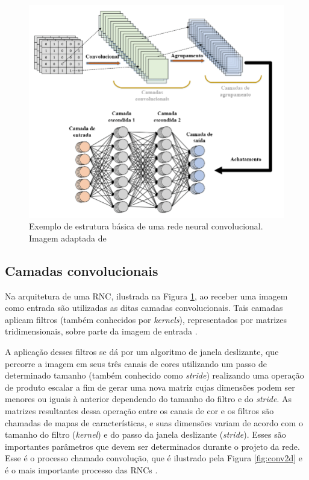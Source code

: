 \begin{figure}[H]
  \centering
  \includegraphics[width=.8\linewidth]{figures/2_theoric_foundamentations/cnn.png}
  \caption[Estrutura básica de uma rede neural convolucional.]{Exemplo de estrutura básica de uma rede neural convolucional. Imagem adaptada de \cite{srinivasan2021durld}}
  \label{fig:cnn}
\end{figure}

\subsection{Camadas convolucionais}

Na arquitetura de uma \ac{RNC}, ilustrada na Figura \ref{fig:cnn}, ao receber uma imagem como entrada são utilizadas as ditas camadas convolucionais. Tais camadas aplicam filtros (também conhecidos por \textit{kernels}), representados por matrizes tridimensionais, sobre parte da imagem de entrada \cite{rawat2017deep}.

A aplicação desses filtros se dá por um algoritmo de janela deslizante, que percorre a imagem em seus três canais de cores utilizando um passo de determinado tamanho (também conhecido como \textit{stride}) realizando uma operação de produto escalar a fim de gerar uma nova matriz cujas dimensões podem ser menores ou iguais à anterior dependendo do tamanho do filtro e do \textit{stride}. As matrizes resultantes dessa operação entre os canais de cor e os filtros são chamadas de mapas de características, e suas dimensões variam de acordo com o tamanho do filtro (\textit{kernel}) e do passo da janela deslizante (\textit{stride}). Esses são importantes parâmetros que devem ser determinados durante o projeto da rede. Esse é o processo chamado convolução, que é ilustrado pela Figura \ref{fig:conv2d} e é o mais importante processo das \ac{RNC}s \cite{geron2019maos}. 


